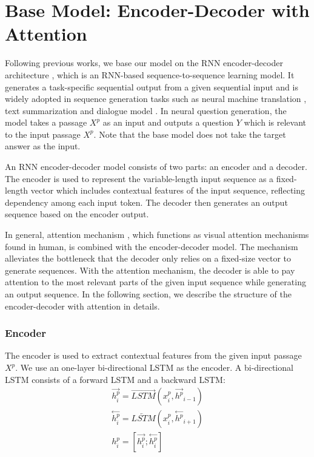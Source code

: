 \documentclass[letterpaper]{article} %
\begin{document}
\section{Base Model: Encoder-Decoder with Attention}
Following previous works, we base our model on the RNN encoder-decoder architecture \cite{sutskever2014sequence}, which is an RNN-based sequence-to-sequence learning model. It generates a task-specific sequential output from a given sequential input and is widely adopted in sequence generation tasks such as neural machine translation \cite{sutskever2014sequence,bahdanau2014neural}, text summarization \cite{nallapati2016abstractive} and dialogue model \cite{serban2016building,serban2017hierarchical}. In neural question generation, the model takes a passage \(X^p \) as an input and outputs a question \(Y\) which is relevant to the input passage \(X^p\). Note that the base model does not take the target answer as the input.

An RNN encoder-decoder model consists of two parts: an encoder and a decoder. The encoder is used to represent the variable-length input sequence as a fixed-length vector which includes contextual features of the input sequence, reflecting dependency among each input token. The decoder then generates an output sequence based on the encoder output.
% 
% 

In general, attention mechanism \cite{bahdanau2014neural}, which functions as visual attention mechanisms found in human, is combined with the encoder-decoder model. The mechanism alleviates the bottleneck that the decoder only relies on a fixed-size vector to generate sequences. With the attention mechanism, the decoder is able to pay attention to the most relevant parts of the given input sequence while generating an output sequence. In the following section, we describe the structure of the encoder-decoder with attention in details.
% 
% 
% 

\subsubsection{Encoder}
The encoder is used to extract contextual features from the given input passage \(X^p\). We use an one-layer bi-directional LSTM as the encoder. A bi-directional LSTM consists of a forward LSTM and a backward LSTM:
\begin{gather}
\overset{\rightarrow}{h^p_i} = \overrightarrow{LSTM}(x^p_i, \overset{\rightarrow}{h^p}_{i-1})  \label{eq_3} \\
\overset{\leftarrow}{h^p_i} = \overleftarrow{LSTM}(x^p_i, \overset{\leftarrow}{h^p}_{i+1})  \label{eq_4} \\
h^p_i = [\overset{\rightarrow}{h^p_i};\overset{\leftarrow}{h^p_i}] \label{eq_5}
\end{gather}
\end{document}
